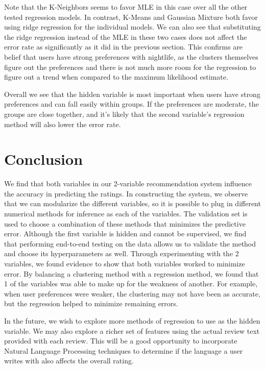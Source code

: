 \documentclass[11pt]{article}
\begin{document}
Note that the K-Neighbors seems to favor MLE in this case over all the other tested regression models. In contrast, K-Means and Gaussian Mixture both favor using ridge regression for the individual models. We can also see that substituting the ridge regression instead of the MLE in these two cases does not affect the error rate as significantly as it did in the previous section. This confirms are belief that users have strong preferences with nightlife, as the clusters themselves figure out the preferences and there is not much more room for the regression to figure out a trend when compared to the maximum likelihood estimate.

Overall we see that the hidden variable is most important when users have strong preferences and can fall easily within groups. If the preferences are moderate, the groups are close together, and it's likely that the second variable's regression method will also lower the error rate.

\section{Conclusion}
We find that both variables in our 2-variable recommendation system influence the accuracy in predicting the ratings. In constructing the system, we observe that we can modularize the different variables, so it is possible to plug in different numerical methods for inference as each of the variables. The validation set is used to choose a combination of these methods that minimizes the predictive error. Although the first variable is hidden and cannot be supervised, we find that performing end-to-end testing on the data allows us to validate the method and choose its hyperparameters as well. Through experimenting with the 2 variables, we found evidence to show that both variables worked to minimize error. By balancing a clustering method with a regression method, we found that 1 of the variables was able to make up for the weakness of another. For example, when user preferences were weaker, the clustering may not have been as accurate, but the regression helped to minimize remaining errors.

In the future, we wish to explore more methods of regression to use as the hidden variable. We may also explore a richer set of features using the actual review text provided with each review. This will be a good opportunity to incorporate Natural Language Processing techniques to determine if the language a user writes with also affects the overall rating.

\clearpage

\end{document}
